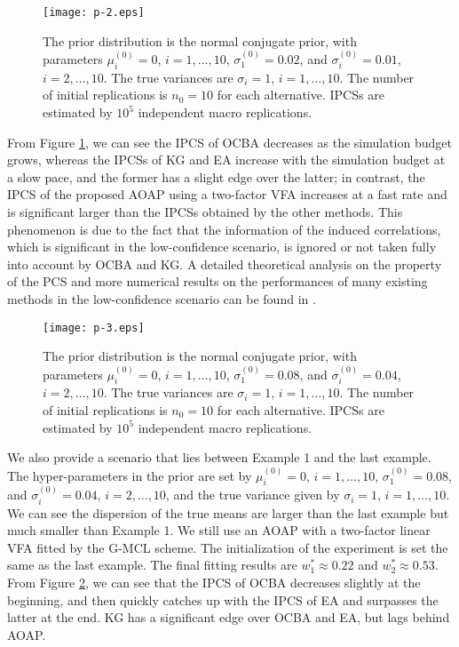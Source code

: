 \documentclass[journal]{IEEEtran}
\begin{document}
     
      \begin{figure}[tb]
      \begin{center}
      \texttt{[image: p-2.eps]}
      \caption{ The prior distribution is the normal conjugate prior, with parameters $\mu_i^{(0)}=0$, $i=1,\ldots,10$, $\sigma^{(0)}_{1}=0.02$, and $\sigma^{(0)}_i=0.01$, $i=2,\ldots,10$. The true variances are $\sigma_i=1$, $i=1,\ldots,10$. The number of initial replications is $n_0=10$ for each alternative. IPCSs are estimated by $10^5$ independent macro replications.}
      \label{pic2} 
      \end{center} \end{figure}  
      
      From Figure \ref{pic2}, we can see the IPCS of OCBA decreases as the simulation budget grows, whereas the IPCSs of KG and EA increase with the simulation budget at a slow pace, and the former has a slight edge over the latter; in contrast, the IPCS of the proposed AOAP using a two-factor VFA increases at a fast rate and  is significant larger than the IPCSs obtained by the other methods. This phenomenon is due to the fact that the information of the induced correlations, which is significant in the low-confidence scenario, is ignored or not taken fully into account by OCBA and KG. A detailed theoretical analysis on the property of the PCS and more numerical results on the performances of many existing methods in the low-confidence scenario can be found in \cite{peng2015nonmonotone}.
     
       
           \begin{figure}[tb]
             \begin{center}
             \texttt{[image: p-3.eps]}
             \caption{ The prior distribution is the normal conjugate prior, with parameters $\mu_i^{(0)}=0$, $i=1,\ldots,10$, $\sigma^{(0)}_{1}=0.08$, and  $\sigma^{(0)}_i=0.04$, $i=2,\ldots,10$. The true variances are $\sigma_i=1$, $i=1,\ldots,10$. The number of initial replications is $n_0=10$ for each alternative. IPCSs are estimated by $10^5$ independent macro replications.}
             \label{pic4} 
             \end{center} \end{figure} 
             
          We also provide a scenario that lies between Example 1 and the last example. 
     The hyper-parameters in the prior are set by $\mu_i^{(0)}=0$, $i=1,\ldots,10$,  $\sigma^{(0)}_{1}=0.08$, and $\sigma^{(0)}_i=0.04$, $i=2,\ldots,10$, and the true variance given by $\sigma_i=1$, $i=1,\ldots,10$. We can see the dispersion of the true means are larger than the last example but much smaller than Example 1. We still use an AOAP with a two-factor linear VFA  fitted by the G-MCL scheme. The initialization of the experiment is set the same as the last example. The final fitting results are $w_1^{*}\approx 0.22$ and $w_2^{*}\approx 0.53$. From Figure \ref{pic4}, we can see that the IPCS of OCBA decreases slightly at the beginning, and then quickly catches up with the IPCS of EA and surpasses the latter at the end. KG has a significant edge over OCBA and EA, but lags behind AOAP. 
\end{document}
